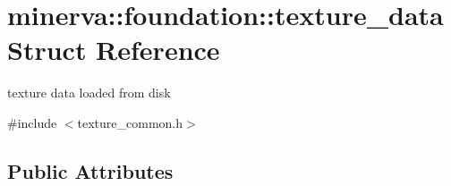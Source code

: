\hypertarget{structminerva_1_1foundation_1_1texture__data}{}\section{minerva\+:\+:foundation\+:\+:texture\+\_\+data Struct Reference}
\label{structminerva_1_1foundation_1_1texture__data}


texture data loaded from disk  




{\ttfamily \#include $<$texture\+\_\+common.\+h$>$}

\subsection*{Public Attributes}
